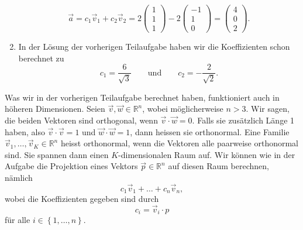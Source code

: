 \begin{losung}
\begin{enumerate}[label=(\alph*)]
		\begin{equation*}
			\vec a
			=c_1\vec v_1+c_2\vec v_2
			=2\begin{pmatrix}
				1 \\ 1 \\ 1
			\end{pmatrix}
			-2\begin{pmatrix}
				-1 \\ 1 \\ 0
			\end{pmatrix}
			=\begin{pmatrix}
				4 \\ 0 \\ 2
			\end{pmatrix}.
		\end{equation*}
		\item In der Lösung der vorherigen Teilaufgabe haben wir die Koeffizienten schon berechnet zu
		\begin{equation*}
			c_1=\frac{6}{\sqrt{3}}
			\quad\quad\text{und}\quad\quad
			c_2=-\frac{2}{\sqrt{2}}.
		\end{equation*}
	\end{enumerate}
\end{losung}

Was wir in der vorherigen Teilaufgabe berechnet haben, funktioniert auch in höheren Dimensionen.
Seien $\vec v,\vec w\in\mathbb R^n$, wobei möglicherweise $n>3$.
Wir sagen, die beiden Vektoren sind orthogonal, wenn $\vec v\cdot\vec w=0$.
Falls sie zusätzlich Länge 1 haben, also $\vec v\cdot\vec v=1$ und $\vec w\cdot\vec w=1$, dann heissen sie orthonormal.
Eine Familie $\vec v_1,\ldots,\vec v_K\in\mathbb R^n$ heisst orthonormal, wenn die Vektoren alle paarweise orthonormal sind.
Sie spannen dann einen $K$-dimensionalen Raum auf.
Wir können wie in der Aufgabe die Projektion eines Vektors $\vec p\in\mathbb R^n$ auf diesen Raum berechnen, nämlich
\begin{equation*}
	c_1\vec v_1+\ldots+c_n\vec v_n,
\end{equation*}
wobei die Koeffizienten gegeben sind durch
\begin{equation*}
	c_i=\vec v_i\cdot p
\end{equation*}
für alle $i\in\left\{1,\ldots,n\right\}$.

